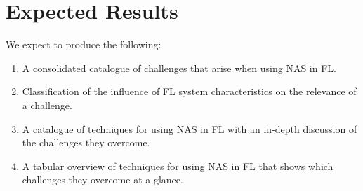 \section{Expected Results}

We expect to produce the following:
\begin{enumerate}
	\item A consolidated catalogue of challenges that arise when using NAS in FL.
	\item Classification of the influence of FL system characteristics on the relevance of a challenge.
	\item A catalogue of techniques for using NAS in FL with an in-depth discussion of the challenges they overcome.
	\item A tabular overview of techniques for using NAS in FL that shows which challenges they overcome at a glance.
\end{enumerate}
